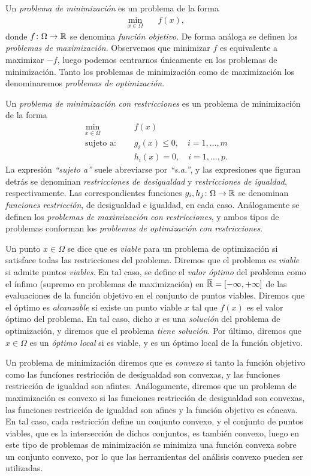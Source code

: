 \documentclass{book}
\begin{document}
\begin{definition}
	Un \emph{problema de minimización} es un problema de la forma
	\begin{align*}
		\min_{x \in \Omega} &\quad f(x),
	\end{align*}
	donde $f\colon \Omega \to \mathbb{R}$ se denomina \emph{función objetivo}. De forma análoga se definen los \emph{problemas de maximización}. Observemos que minimizar $f$ es equivalente a maximizar $-f$, luego podemos centrarnos únicamente en los problemas de minimización. Tanto los problemas de minimización como de maximización los denominaremos \emph{problemas de optimización}.

	Un \emph{problema de minimización con restricciones} es un problema de minimización de la forma
	\begin{align*}
		\min_{x \in \Omega} &\quad f(x)  \\
		\text{sujeto a: } &\quad g_i(x) \le 0, \quad i=1,\dots,m \\
						  &\quad h_i(x) = 0, \quad i=1,\dots,p.
	\end{align*}
	La expresión \emph{``sujeto a''} suele abreviarse por \emph{``s.a.''}, y las expresiones que figuran detrás se denominan \emph{restricciones de desigualdad} y \emph{restricciones de igualdad}, respectivamente. Las correspondientes funciones $g_i,h_j \colon \Omega \to \mathbb{R}$ se denominan \emph{funciones restricción}, de desigualdad e igualdad, en cada caso. Análogamente se definen los \emph{problemas de maximización con restricciones}, y ambos tipos de problemas conforman los \emph{problemas de optimización con restricciones}.

	Un punto $x \in \Omega$ se dice que es \emph{viable} para un problema de optimización si satisface todas las restricciones del problema. Diremos que el problema es \emph{viable} si admite puntos \emph{viables}. En tal caso, se define el \emph{valor óptimo} del problema como el ínfimo (supremo en problemas de maximización) en $\closure{\R} = [-\infty,+\infty]$ de las evaluaciones de la función objetivo en el conjunto de puntos viables. Diremos que el óptimo es \emph{alcanzable} si existe un punto viable $x$ tal que $f(x)$ es el valor óptimo del problema. En tal caso, dicho $x$ es una \emph{solución} del problema de optimización, y diremos que el problema \emph{tiene solución}. Por último, diremos que $x \in \Omega$ es un \emph{óptimo local} si es viable, y es un óptimo local de la función objetivo.

	Un problema de minimización diremos que es \emph{convexo} si tanto la función objetivo como las funcíones restricción de desigualdad son convexas, y las funciones restricción de igualdad son afintes. Análogamente, diremos que un problema de maximización es convexo si las funciones restricción de desigualdad son convexas, las funciones restricción de igualdad son afines y la función objetivo es cóncava. En tal caso, cada restricción define un conjunto convexo, y el conjunto de puntos viables, que es la intersección de dichos conjuntos, es también convexo, luego en este tipo de problemas de minimización se minimiza una función convexa sobre un conjunto convexo, por lo que las herramientas del análisis convexo pueden ser utilizadas.
\end{definition}
\end{document}
